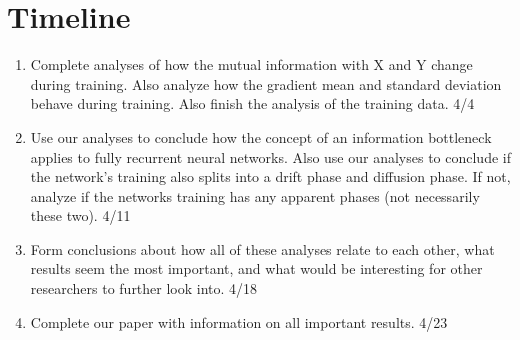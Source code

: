 \section{Timeline}
\begin{enumerate}
	\item Complete analyses of how the mutual information with X and Y change
    during training. Also analyze how the gradient mean and standard deviation
    behave during training. Also finish the analysis of the training data. 4/4
	\item Use our analyses to conclude how the concept of an information bottleneck applies to fully recurrent neural networks. Also use our analyses to conclude if the network’s training also splits into a drift phase and diffusion phase. If not, analyze if the networks training has any apparent phases (not necessarily these two). 4/11
	\item Form conclusions about how all of these analyses relate to each other, what results seem the most important, and what would be interesting for other researchers to further look into. 4/18
	\item Complete our paper with information on all important results. 4/23
\end{enumerate}




